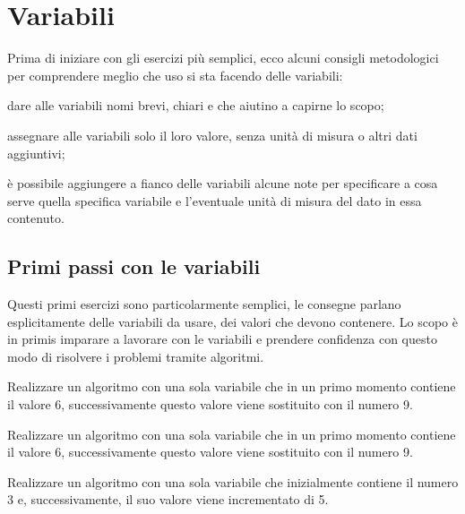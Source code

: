 \chapter{Variabili}

Prima di iniziare con gli esercizi più semplici, ecco alcuni consigli metodologici per comprendere meglio che uso si sta facendo delle variabili:

\begin{aenumerate}
	\item dare alle variabili nomi brevi, chiari e che aiutino a capirne lo scopo;
	\item assegnare alle variabili solo il loro valore, senza unità di misura o altri dati aggiuntivi;
	\item è possibile aggiungere a fianco delle variabili alcune note per specificare a cosa serve quella specifica variabile e l'eventuale unità di misura del dato in essa contenuto.
\end{aenumerate}

\section{Primi passi con le variabili}

Questi primi esercizi sono particolarmente semplici, le consegne parlano esplicitamente delle variabili da usare, dei valori che devono contenere. Lo scopo è in primis imparare a lavorare con le variabili e prendere confidenza con questo modo di risolvere i problemi tramite algoritmi.

\begin{exercise}
	Realizzare un algoritmo con una sola variabile che in un primo momento contiene il valore 6, successivamente questo valore viene sostituito con il numero 9.
\end{exercise}

\begin{exercise}
	Realizzare un algoritmo con una sola variabile che in un primo momento contiene il valore 6, successivamente questo valore viene sostituito con il numero 9.
\end{exercise}

\begin{exercise}
	Realizzare un algoritmo con una sola variabile che inizialmente contiene il numero 3 e, successivamente, il suo valore viene incrementato di 5.
\end{exercise}

